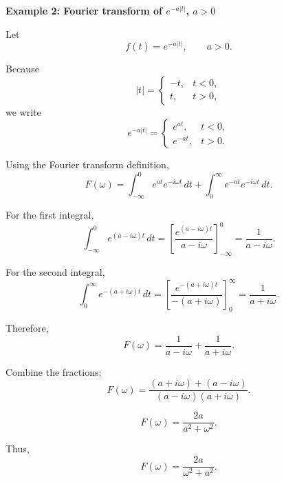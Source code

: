 \begin{examplebox}
    \textbf{Example 2: Fourier transform of $e^{-a|t|}$, $a>0$}

    Let
    \[
        f(t)=e^{-a|t|}, \qquad a>0.
    \]

    Because
    \[
        |t|=
        \begin{cases}
            -t, & t<0, \\
            t,  & t>0,
        \end{cases}
    \]
    we write
    \[
        e^{-a|t|}
        =
        \begin{cases}
            e^{at},  & t<0, \\
            e^{-at}, & t>0.
        \end{cases}
    \]

    Using the Fourier transform definition,
    \[
        F(\omega)
        =
        \int_{-\infty}^{0}e^{at}e^{-i\omega t}\,dt
        +
        \int_0^\infty e^{-at}e^{-i\omega t}\,dt.
    \]

    For the first integral,
    \[
        \int_{-\infty}^{0}e^{(a-i\omega)t}\,dt
        =
        \left[
            \frac{e^{(a-i\omega)t}}{a-i\omega}
            \right]_{-\infty}^{0}
        =
        \frac{1}{a-i\omega}.
    \]

    For the second integral,
    \[
        \int_0^\infty e^{-(a+i\omega)t}\,dt
        =
        \left[
            \frac{e^{-(a+i\omega)t}}{-(a+i\omega)}
            \right]_0^\infty
        =
        \frac{1}{a+i\omega}.
    \]

    Therefore,
    \[
        F(\omega)
        =
        \frac{1}{a-i\omega}
        +
        \frac{1}{a+i\omega}.
    \]

    Combine the fractions:
    \[
        F(\omega)
        =
        \frac{(a+i\omega)+(a-i\omega)}
        {(a-i\omega)(a+i\omega)}.
    \]

    \[
        F(\omega)
        =
        \frac{2a}{a^2+\omega^2}.
    \]

    Thus,
    \[
        \boxed{
            F(\omega)=\frac{2a}{\omega^2+a^2}
        }.
    \]
\end{examplebox}

